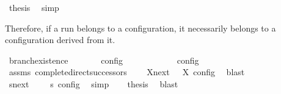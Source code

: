 \begin{isabellebody}
\ {\isacharquery}thesis\ \isamarkupfalse%
\ simp\isanewline
{}\isamarkupfalse%
%
\endisatagproof
{\isafoldproof}%
%
\isadelimproof
%
\endisadelimproof
%
\begin{isamarkuptext}%
Therefore, if a run belongs to a configuration, it necessarily belongs to a
  configuration derived from it.%
\end{isamarkuptext}\isamarkuptrue%
\isamarkupfalse%
\ branch{\isacharunderscore}existence{\isacharcolon}\isanewline
\ \ \ {\isacartoucheopen}{\isasymrho}\ {\isasymin}\ {\isasymlbrakk}\ {\isasymS}\ {\isasymrbrakk}\isactrlsub c\isactrlsub o\isactrlsub n\isactrlsub f\isactrlsub i\isactrlsub g{\isacartoucheclose}\isanewline
\ \ \ {\isacartoucheopen}{\isasymexists}{\isasymS}\ {\isacharparenleft}{\isasymS}\ {\isasymhookrightarrow}\ {\isasymS}\ {\isasymand}\ {\isacharparenleft}{\isasymrho}\ {\isasymin}\ {\isasymlbrakk}\ {\isasymS}\ {\isasymrbrakk}\isactrlsub c\isactrlsub o\isactrlsub n\isactrlsub f\isactrlsub i\isactrlsub g{\isacharparenright}{\isacartoucheclose}\isanewline
%
\isadelimproof
%
\endisadelimproof
%
\isatagproof
{}\isamarkupfalse%
\ {\isacharminus}\isanewline
\ \ \isamarkupfalse%
\ assms\ complete{\isacharunderscore}direct{\isacharunderscore}successors{\isacharprime}\ \isamarkupfalse%
\ {\isacartoucheopen}{\isasymrho}\ {\isasymin}\ {\isacharparenleft}{\isasymUnion}X{\isasymin}{\isasymC}\isactrlsub n\isactrlsub e\isactrlsub x\isactrlsub t\ {\isasymS}\ {\isasymlbrakk}\ X\ {\isasymrbrakk}\isactrlsub c\isactrlsub o\isactrlsub n\isactrlsub f\isactrlsub i\isactrlsub g{\isacharparenright}{\isacartoucheclose}\ \isamarkupfalse%
\ blast\isanewline
\ \ \isamarkupfalse%
\ {\isacartoucheopen}{\isasymexists}s{\isasymin}{\isasymC}\isactrlsub n\isactrlsub e\isactrlsub x\isactrlsub t\ {\isasymS}\ {\isasymrho}\ {\isasymin}\ {\isasymlbrakk}\ s\ {\isasymrbrakk}\isactrlsub c\isactrlsub o\isactrlsub n\isactrlsub f\isactrlsub i\isactrlsub g{\isacartoucheclose}\ \isamarkupfalse%
\ simp\isanewline
\ \ \isamarkupfalse%
\ {\isacharquery}thesis\ \isamarkupfalse%
\ blast\isanewline
{}\isamarkupfalse%
%
\endisatagproof
{\isafoldproof}%
%
\isadelimproof
\isanewline

\end{isabellebody}
